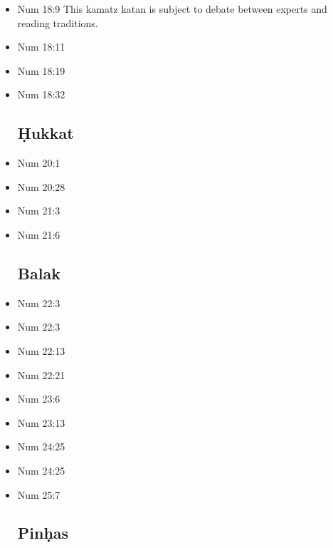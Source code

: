 \documentclass[14pt]{book}
\begin{document}
\begin{multicols}{2}
\begin{itemize}
\item Num 18:9 This kamatz katan is subject to debate between experts and reading traditions.

\item Num 18:11

\item Num 18:19

\item Num 18:32

\subsection{\d{H}ukkat}

\item Num 20:1

\item Num 20:28

\item Num 21:3

\item Num 21:6

\subsection{Balak}

\item Num 22:3

\item Num 22:3

\item Num 22:13

\item Num 22:21

\item Num 23:6

\item Num 23:13

\item Num 24:25

\item Num 24:25

\item Num 25:7

\subsection{Pin\d{h}as}


\end{itemize}
\end{multicols}
\end{document}
